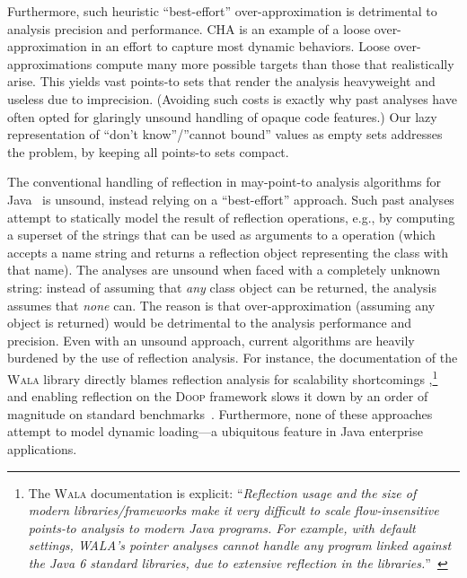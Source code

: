 Furthermore, such heuristic ``best-effort'' over-approximation is
detrimental to analysis precision and performance. CHA is an example
of a loose over-approximation in an effort to capture most dynamic
behaviors.
Loose over-approximations compute many more possible targets than
those that realistically arise. This yields vast points-to sets that
render the analysis heavyweight and useless due to imprecision.
(Avoiding such costs is exactly why past analyses have often opted for glaringly
unsound handling of opaque code features.)
Our lazy representation of ``don't know''/''cannot bound'' values as empty
sets addresses the problem, by keeping all points-to sets compact.


The conventional handling of reflection in may-point-to analysis
algorithms for
Java~\cite{www:wala-reflection,ecoop:2014:Li,aplas:2005:Livshits,thesis:Livshits,aplas:2015:Smaragdakis,sas:2015:Li}
is unsound, instead relying on a ``best-effort'' approach.  Such past
analyses attempt to statically model the result of reflection
operations, e.g., by computing a superset of the strings that can be
used as arguments to a  operation (which accepts a
name string and returns a reflection object representing the class
with that name).
The analyses are unsound when faced with a completely unknown string:
instead of assuming that \emph{any} class object can be returned, the
analysis assumes that \emph{none} can. The reason is that
over-approximation (assuming any object is returned) would be
detrimental to the analysis performance and precision. Even with an
unsound approach, current algorithms are heavily burdened by the use
of reflection analysis. For instance, the documentation of the
\textsc{Wala} library directly blames reflection analysis for
scalability shortcomings
\cite{www:wala-reflection},\footnote{The \textsc{Wala} documentation
  is explicit: ``\emph{Reflection usage and the
    size of modern libraries/frameworks make it very difficult to
    scale flow-insensitive points-to analysis to modern Java
    programs. For example, with default settings, WALA's pointer
    analyses cannot handle any program linked against the Java 6
    standard libraries, due to extensive reflection in the
    libraries.}''~\cite{www:wala-reflection}} and enabling reflection
on the \textsc{Doop} framework slows it down by an order of magnitude
on standard benchmarks~\cite{aplas:2015:Smaragdakis}.
Furthermore, none
of these approaches attempt to model dynamic loading---a ubiquitous
feature in Java enterprise applications.

